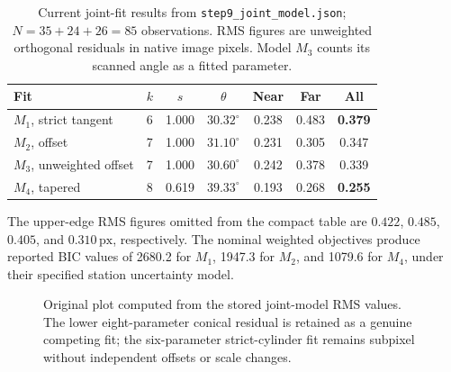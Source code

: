\documentclass[11pt,letterpaper]{article}
\newcommand{\px}{\,\mathrm{px}}
\newcommand{\sourcepath}[1]{\nolinkurl{#1}}
\begin{document}
\begin{table}[ht]
\centering\small
\caption{Current joint-fit results from \sourcepath{step9_joint_model.json}; \(N=35+24+26=85\) observations. RMS figures are unweighted orthogonal residuals in native image pixels. Model \(M_3\) counts its scanned angle as a fitted parameter.}
\label{tab:joint}
\begin{tabularx}{\linewidth}{@{}l c c c c c c@{}}
\toprule
\textbf{Fit} & \(k\) & \(s\) & \(\theta\) & \textbf{Near} & \textbf{Far} & \textbf{All} \\
\midrule
\(M_1\), strict tangent & 6 & 1.000 & \(30.32^\circ\) & 0.238 & 0.483 & \textbf{0.379} \\
\(M_2\), offset & 7 & 1.000 & \(31.10^\circ\) & 0.231 & 0.305 & 0.347 \\
\(M_3\), unweighted offset & 7 & 1.000 & \(30.60^\circ\) & 0.242 & 0.378 & 0.339 \\
\(M_4\), tapered & 8 & 0.619 & \(39.33^\circ\) & 0.193 & 0.268 & \textbf{0.255} \\
\bottomrule
\end{tabularx}
\vspace{4pt}
\begin{minipage}{0.96\linewidth}\footnotesize\color{slate}
The upper-edge RMS figures omitted from the compact table are \(0.422\), \(0.485\), \(0.405\), and \(0.310\px\), respectively. The nominal weighted objectives produce reported BIC values of 2680.2 for \(M_1\), 1947.3 for \(M_2\), and 1079.6 for \(M_4\), under their specified station uncertainty model.
\end{minipage}
\end{table}

\begin{figure}[ht]
\centering
{}
\caption{Original plot computed from the stored joint-model RMS values. The lower eight-parameter conical residual is retained as a genuine competing fit; the six-parameter strict-cylinder fit remains subpixel without independent offsets or scale changes.}
\label{fig:rms}
\end{figure}
\end{document}
